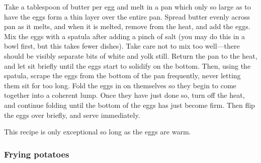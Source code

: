\documentclass[10pt]{article}
\begin{document}
Take a tablespoon of butter per egg and melt in a pan which only so large as to have the eggs form a thin layer over the entire pan.
Spread butter evenly across pan as it melts, and when it is melted, remove from the heat, and add the eggs.
Mix the eggs with a spatula after adding a pinch of salt (you may do this in a bowl first, but this takes fewer dishes).
Take care not to mix too well---there should be visibly separate bits of white and yolk still.
Return the pan to the heat, and let sit briefly until the eggs start to solidify on the bottom.
Then, using the spatula, scrape the eggs from the bottom of the pan frequently, never letting them sit for too long.
Fold the eggs in on themselves so they begin to come together into a coherent lump.
Once they have just done so, turn off the heat, and continue folding until the bottom of the eggs has just become firm.
Then flip the eggs over briefly, and serve immediately.

This recipe is only exceptional so long as the eggs are warm.

\subsubsection*{Frying potatoes}
\end{document}
